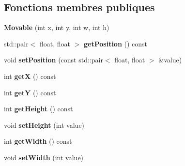 \subsection*{Fonctions membres publiques}
\begin{DoxyCompactItemize}
\item 
\hypertarget{class_movable_a0f3db8a48888f6a5c98745d3238aa22b}{{\bfseries Movable} (int x, int y, int w, int h)}\label{class_movable_a0f3db8a48888f6a5c98745d3238aa22b}

\item 
\hypertarget{class_movable_aaa8190ded7b252ac540fc8513df8be33}{std\+::pair$<$ float, float $>$ {\bfseries get\+Position} () const }\label{class_movable_aaa8190ded7b252ac540fc8513df8be33}

\item 
\hypertarget{class_movable_a1d746391eb27b8f36183a11ba1562fbe}{void {\bfseries set\+Position} (const std\+::pair$<$ float, float $>$ \&value)}\label{class_movable_a1d746391eb27b8f36183a11ba1562fbe}

\item 
\hypertarget{class_movable_acceb7d48ed2242dd1e58e1fceb31d90d}{int {\bfseries get\+X} () const }\label{class_movable_acceb7d48ed2242dd1e58e1fceb31d90d}

\item 
\hypertarget{class_movable_acbea74771292c0b58dd36c72b5867bee}{int {\bfseries get\+Y} () const }\label{class_movable_acbea74771292c0b58dd36c72b5867bee}

\item 
\hypertarget{class_movable_a426ada0097a696f1c39c54c37615e0ec}{int {\bfseries get\+Height} () const }\label{class_movable_a426ada0097a696f1c39c54c37615e0ec}

\item 
\hypertarget{class_movable_af2947142eb5649a48dfe0a2fc92fe53f}{void {\bfseries set\+Height} (int value)}\label{class_movable_af2947142eb5649a48dfe0a2fc92fe53f}

\item 
\hypertarget{class_movable_a361ced3a9f1ad165fd0ce0ea4697b3d8}{int {\bfseries get\+Width} () const }\label{class_movable_a361ced3a9f1ad165fd0ce0ea4697b3d8}

\item 
\hypertarget{class_movable_a06070dd0aa049080959ce8856b90a6ee}{void {\bfseries set\+Width} (int value)}\label{class_movable_a06070dd0aa049080959ce8856b90a6ee}

\end{DoxyCompactItemize}

